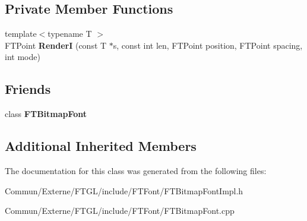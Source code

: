 \subsection*{Private Member Functions}
\begin{DoxyCompactItemize}
\item 
{\footnotesize template$<$typename T $>$ }\\F\+T\+Point {\bfseries RenderI} (const T $\ast$s, const int len, F\+T\+Point position, F\+T\+Point spacing, int mode)\hypertarget{class_f_t_bitmap_font_impl_aeb0b662cfb0d0b8ab991c270074f54dc}{}\label{class_f_t_bitmap_font_impl_aeb0b662cfb0d0b8ab991c270074f54dc}

\end{DoxyCompactItemize}
\subsection*{Friends}
\begin{DoxyCompactItemize}
\item 
class {\bfseries F\+T\+Bitmap\+Font}\hypertarget{class_f_t_bitmap_font_impl_a7ba5a198d501799828a37b4b808b9352}{}\label{class_f_t_bitmap_font_impl_a7ba5a198d501799828a37b4b808b9352}

\end{DoxyCompactItemize}
\subsection*{Additional Inherited Members}


The documentation for this class was generated from the following files\+:\begin{DoxyCompactItemize}
\item 
Commun/\+Externe/\+F\+T\+G\+L/include/\+F\+T\+Font/F\+T\+Bitmap\+Font\+Impl.\+h\item 
Commun/\+Externe/\+F\+T\+G\+L/include/\+F\+T\+Font/F\+T\+Bitmap\+Font.\+cpp\end{DoxyCompactItemize}
